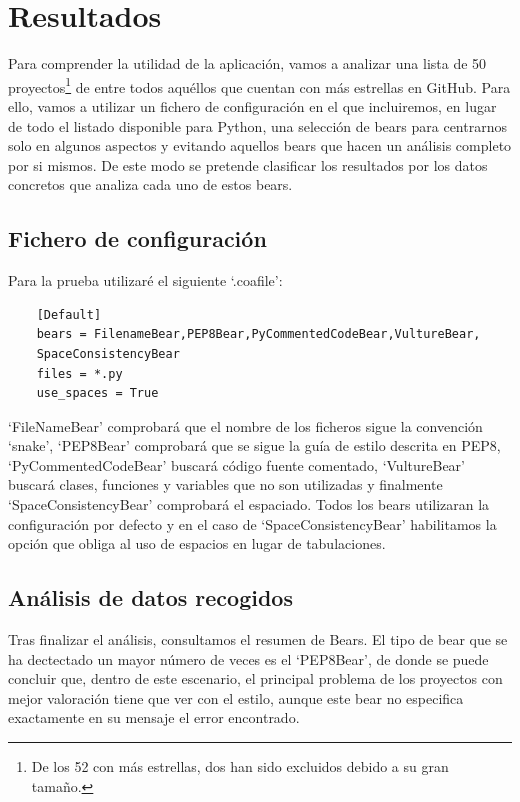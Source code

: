 \documentclass[a4paper, 12pt]{book}
\begin{document}

\cleardoublepage
\chapter{Resultados}
Para comprender la utilidad de la aplicación, vamos a analizar una lista de 50 proyectos\footnote{De los 52 con más estrellas, dos han sido excluidos debido a su gran tamaño.} de entre todos aquéllos que cuentan con más estrellas en GitHub. Para ello, vamos a utilizar un fichero de configuración en el que incluiremos, en lugar de todo el listado disponible para Python, una selección de bears para centrarnos solo en algunos aspectos y evitando aquellos bears que hacen un análisis completo por si mismos. De este modo se pretende clasificar los resultados por los datos concretos que analiza cada uno de estos bears.

\section{Fichero de configuración}
\label{sec:_coafile}
Para la prueba utilizaré el siguiente `.coafile':

{\footnotesize
\begin{verbatim}
    [Default]
    bears = FilenameBear,PEP8Bear,PyCommentedCodeBear,VultureBear,
    SpaceConsistencyBear
    files = *.py
    use_spaces = True
\end{verbatim}
}
`FileNameBear' comprobará que el nombre de los ficheros sigue la convención `snake', `PEP8Bear' comprobará que se sigue la guía de estilo descrita en PEP8, `PyCommentedCodeBear' buscará código fuente comentado, `VultureBear' buscará clases, funciones y variables que no son utilizadas y finalmente `SpaceConsistencyBear' comprobará el espaciado. Todos los bears utilizaran la configuración por defecto y en el caso de `SpaceConsistencyBear' habilitamos la opción que obliga al uso de espacios en lugar de tabulaciones.

\section{Análisis de datos recogidos}
\label{sec:_datarec}
Tras finalizar el análisis, consultamos el resumen de Bears. El tipo de bear que se ha dectectado un mayor número de veces es el `PEP8Bear', de donde se puede concluir que, dentro de este escenario, el principal problema de los proyectos con mejor valoración tiene que ver con el estilo, aunque este bear no especifica exactamente en su mensaje el error encontrado.
\end{document}
